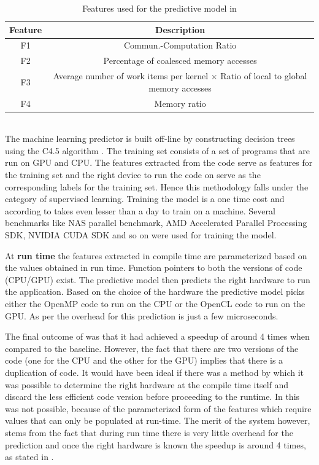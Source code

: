 \documentclass[a4paper,11pt]{article}
\begin{document}
	\begin{table}[h!]
	\centering
	\begin{tabular}{|| c | c ||} 
		\hline
		\textbf{Feature} & \textbf{Description} \\ [0.5ex] 
		\hline
		F1 & Commun.-Computation Ratio \\ 
		\hline
		F2 & Percentage of coalesced memory accesses  \\
		\hline
		F3 & Average number of work items per kernel $\times$ Ratio of local to global memory accesses\\
		\hline
		F4 & Memory ratio  \\ [1ex]
		\hline
	\end{tabular}
	\caption{Features used for the predictive model in \cite{second}} %
\end{table}\\
\indent The machine learning predictor is built off-line by constructing decision trees using the C4.5 algorithm \cite{c4}. The training set consists of a set of programs that are run on GPU and CPU. The features extracted from the code serve as features for the training set and the right device to run the code on serve as the corresponding labels for the training set. Hence this methodology falls under the category of supervised learning. Training the model is a one time cost and according to \cite{second} takes even lesser than a day to train on a machine. Several benchmarks like NAS parallel benchmark\cite{nasbenchmark}, AMD Accelerated Parallel Processing SDK\cite{amdbenchmark}, NVIDIA CUDA SDK\cite{nvdiabenchmark} and so on were used for training the model.
 
At \textbf{run time}  the features extracted in compile time are parameterized  based on the values obtained in run time. Function pointers to both the versions of code (CPU/GPU) exist. The predictive model then predicts the right hardware to run the application. Based on the choice of the hardware the predictive model picks either the OpenMP code to run on the CPU or the OpenCL code to run on the GPU. As per \cite{second} the overhead for this prediction is just a few microseconds.

The final outcome of \cite{second} was that it had achieved a speedup of around 4 times when compared to the baseline. However, the fact that there are two versions of the code (one for the CPU and the other for the GPU) implies that there is a duplication of code. It would have been ideal if there was a method by which it was possible to determine the right hardware at the compile time itself and discard the less efficient code version before proceeding to the runtime. In \cite{second} this was not possible, because of the parameterized form of the features which require values that can only be populated at run-time. The merit of the system however, stems from the fact that during run time there is very little overhead for the prediction and once the right hardware is known the speedup is around 4 times, as stated in \cite{second}.
\end{document}
